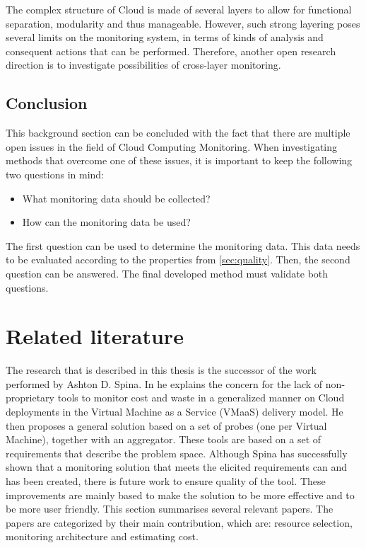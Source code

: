 \noindent
The complex structure of Cloud is made of several layers to allow for functional separation, modularity and thus manageable. However, such strong layering poses several limits on the monitoring system, in terms of kinds of analysis and consequent actions that can be performed. Therefore, another open research direction is to investigate possibilities of cross-layer monitoring.

\subsection{Conclusion}
This background section can be concluded with the fact that there are multiple open issues in the field of Cloud Computing Monitoring. When investigating methods that overcome one of these issues, it is important to keep the following two questions in mind:
\begin{itemize}
    \item What monitoring data should be collected?
    \item How can the monitoring data be used?
\end{itemize} 
The first question can be used to determine the monitoring data. This data needs to be evaluated according to the properties from \autoref{sec:quality}. Then, the second question can be answered. The final developed method must validate both questions.


\section{Related literature} \label{sec:related_literature}
The research that is described in this thesis is the successor of the work performed by Ashton D. Spina. In \cite{spina} he explains the concern for the lack of non-proprietary tools to monitor cost and waste in a generalized manner on Cloud deployments in the Virtual Machine as a Service (VMaaS) delivery model. He then proposes a general solution based on a set of probes (one per Virtual Machine), together with an aggregator. These tools are based on a set of requirements that describe the problem space. Although Spina has successfully shown that a monitoring solution that meets the elicited requirements can and has been created, there is future work to ensure quality of the tool. These improvements are mainly based to make the solution to be more effective and to be more user friendly. This section summarises several relevant papers. The papers are categorized by their main contribution, which are: resource selection, monitoring architecture and estimating cost.

